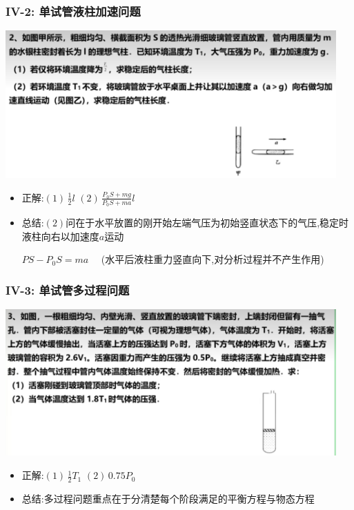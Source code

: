 \documentclass{article}
\begin{document}
\subsubsection{IV-2: 单试管液柱加速问题}
\includegraphics[width = 0.95\textwidth,keepaspectratio]{./pictures/2.3-13.png}

\begin{itemize}
    \item 正解:\quad $(1) \, \frac{1}{2}l$  $(2) \, \frac{P_{0}S + mg}{P_{0}S + ma} l$
    \item 总结:\quad $(2)$问在于水平放置的刚开始左端气压为初始竖直状态下的气压,稳定时液柱向右以加速度$a$运动

          \hspace{3.2em}$PS - P_{0}S = ma \quad$ (水平后液柱重力竖直向下,对分析过程并不产生作用)
\end{itemize}

\vspace{2em}

\subsubsection{IV-3: 单试管多过程问题}
\includegraphics[width = 0.95\textwidth,keepaspectratio]{./pictures/2.3-14.png}

\begin{itemize}
    \item 正解:\quad $(1) \, \frac{1}{2}T_{1}$  $(2) \, 0.75P_{0}$
    \item 总结:\quad 多过程问题重点在于分清楚每个阶段满足的平衡方程与物态方程
\end{itemize}
\end{document}
